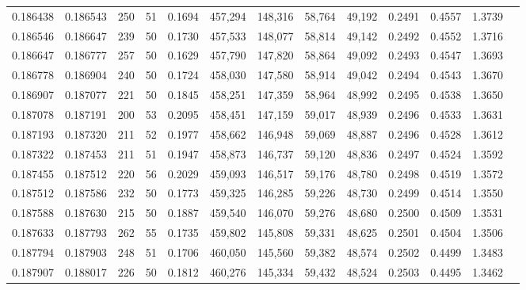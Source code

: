 \begin{tabular}{rrrrrrrrrrrrr}
0.186438 & 0.186543 &   250 &  51 &                                     0.1694 & 457,294 & 148,316 &  58,764 &  49,192 & 0.2491 & 0.4557 & 1.3739 \\
0.186546 & 0.186647 &   239 &  50 &                                     0.1730 & 457,533 & 148,077 &  58,814 &  49,142 & 0.2492 & 0.4552 & 1.3716 \\
0.186647 & 0.186777 &   257 &  50 &                                     0.1629 & 457,790 & 147,820 &  58,864 &  49,092 & 0.2493 & 0.4547 & 1.3693 \\
0.186778 & 0.186904 &   240 &  50 &                                     0.1724 & 458,030 & 147,580 &  58,914 &  49,042 & 0.2494 & 0.4543 & 1.3670 \\
0.186907 & 0.187077 &   221 &  50 &                                     0.1845 & 458,251 & 147,359 &  58,964 &  48,992 & 0.2495 & 0.4538 & 1.3650 \\
0.187078 & 0.187191 &   200 &  53 &                                     0.2095 & 458,451 & 147,159 &  59,017 &  48,939 & 0.2496 & 0.4533 & 1.3631 \\
0.187193 & 0.187320 &   211 &  52 &                                     0.1977 & 458,662 & 146,948 &  59,069 &  48,887 & 0.2496 & 0.4528 & 1.3612 \\
0.187322 & 0.187453 &   211 &  51 &                                     0.1947 & 458,873 & 146,737 &  59,120 &  48,836 & 0.2497 & 0.4524 & 1.3592 \\
0.187455 & 0.187512 &   220 &  56 &                                     0.2029 & 459,093 & 146,517 &  59,176 &  48,780 & 0.2498 & 0.4519 & 1.3572 \\
0.187512 & 0.187586 &   232 &  50 &                                     0.1773 & 459,325 & 146,285 &  59,226 &  48,730 & 0.2499 & 0.4514 & 1.3550 \\
0.187588 & 0.187630 &   215 &  50 &                                     0.1887 & 459,540 & 146,070 &  59,276 &  48,680 & 0.2500 & 0.4509 & 1.3531 \\
0.187633 & 0.187793 &   262 &  55 &                                     0.1735 & 459,802 & 145,808 &  59,331 &  48,625 & 0.2501 & 0.4504 & 1.3506 \\
0.187794 & 0.187903 &   248 &  51 &                                     0.1706 & 460,050 & 145,560 &  59,382 &  48,574 & 0.2502 & 0.4499 & 1.3483 \\
0.187907 & 0.188017 &   226 &  50 &                                     0.1812 & 460,276 & 145,334 &  59,432 &  48,524 & 0.2503 & 0.4495 & 1.3462 \\

\end{tabular}
